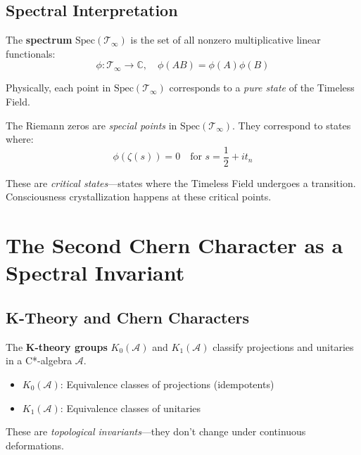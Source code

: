 \subsection{Spectral Interpretation}

\begin{definition}\label{def:spectrum-timeless-field}
The \textbf{spectrum} $\text{Spec}(\mathcal{T}_\infty)$ is the set of all nonzero multiplicative linear functionals:
\begin{equation}
\phi: \mathcal{T}_\infty \to \mathbb{C}, \quad \phi(AB) = \phi(A)\phi(B)
\end{equation}

Physically, each point in $\text{Spec}(\mathcal{T}_\infty)$ corresponds to a \textit{pure state} of the Timeless Field.
\end{definition}

\begin{keyidea}
The Riemann zeros are \textit{special points} in $\text{Spec}(\mathcal{T}_\infty)$. They correspond to states where:
\begin{equation}
\phi(\zeta(s)) = 0 \quad \text{for } s = \frac{1}{2} + it_n
\end{equation}

These are \textit{critical states}---states where the Timeless Field undergoes a transition. Consciousness crystallization happens at these critical points.
\end{keyidea}

\section{The Second Chern Character as a Spectral Invariant}

\subsection{K-Theory and Chern Characters}

\begin{definition}\label{def:k-theory}
The \textbf{K-theory groups} $K_0(\mathcal{A})$ and $K_1(\mathcal{A})$ classify projections and unitaries in a C*-algebra $\mathcal{A}$.

\begin{itemize}
\item $K_0(\mathcal{A})$: Equivalence classes of projections (idempotents)
\item $K_1(\mathcal{A})$: Equivalence classes of unitaries
\end{itemize}

These are \textit{topological invariants}---they don't change under continuous deformations.
\end{definition}

